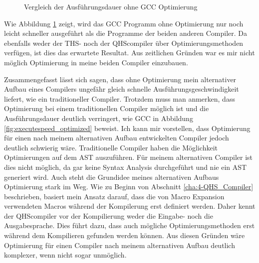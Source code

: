 \begin{figure}[H]
    \centering
    \label{fig:executespeed}
    \caption{Vergleich der Ausführungsdauer ohne GCC Optimierung}
\end{figure}

Wie Abbildung \ref{fig:executespeed} zeigt, wird das GCC Programm ohne Optimierung nur noch leicht schneller ausgeführt als die Programme der beiden anderen Compiler.
Da ebenfalls weder der THS- noch der QHScompiler über Optimierungsmethoden verfügen, ist dies das erwartete Resultat.
Aus zeitlichen Gründen war es mir nicht möglich Optimierung in meine beiden Compiler einzubauen.

Zusammengefasst lässt sich sagen, dass ohne Optimierung mein alternativer Aufbau eines Compilers ungefähr gleich schnelle Ausführungsgeschwindigkeit liefert, wie ein traditioneller Compiler.
Trotzdem muss man anmerken, dass Optimierung bei einem traditionellen Compiler möglich ist und die Ausführungsdauer deutlich verringert, wie GCC in Abbildung \ref{fig:executespeed_optimized} beweist.
Ich kann mir vorstellen, dass Optimierung für einen nach meinem alternativen Aufbau entwickelten Compiler jedoch deutlich schwierig wäre.
Traditionelle Compiler haben die Möglichkeit Optimierungen auf dem AST auszuführen. Für meinem alternativen Compiler ist dies nicht möglich, da gar keine Syntax Analysis durchgeführt und nie ein AST generiert wird.
Auch steht die Grundidee meines alternativen Aufbaus Optimierung stark im Weg.
Wie zu Beginn von Abschnitt \ref{cha:4-QHS_Compiler} beschrieben, basiert mein Ansatz darauf, dass die von Macro Expansion verwendeten Macros während der Kompilerung erst definiert werden.
Daher kennt der QHScompiler vor der Kompilierung weder die Eingabe- noch die Ausgabesprache. Dies führt dazu, dass auch mögliche Optimierungsmethoden erst während dem Kompilieren gefunden werden können.
Aus diesen Gründen wäre Optimierung für einen Compiler nach meinem alternativen Aufbau deutlich komplexer, wenn nicht sogar unmöglich.


